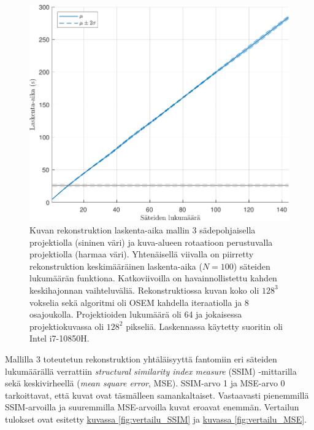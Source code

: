 \begin{figure}[H]
    \centering
    \captionsetup{width=.9\linewidth}
    \includegraphics[width=.9\linewidth]{kuvat/laskenta_aika.pdf}
    \caption{Kuvan rekonstruktion laskenta-aika mallin 3 sädepohjaisella projektiolla (sininen väri) ja kuva-alueen rotaatioon perustuvalla projektiolla (harmaa väri). Yhtenäisellä viivalla on piirretty rekonstruktion keskimääräinen laskenta-aika ($N=100$) säteiden lukumäärän funktiona. Katkoviivoilla on havainnollistettu kahden keskihajonnan vaihteluväliä. Rekonstruktiossa kuvan koko oli $128^3$ vokselia sekä algoritmi oli OSEM kahdella iteraatiolla ja 8 osajoukolla. Projektioiden lukumäärä oli 64 ja jokaisessa projektiokuvassa oli $128^2$ pikseliä. Laskennassa käytetty suoritin oli Intel i7-10850H.}
    \label{fig:laskenta_aika}
\end{figure}

Mallilla 3 toteutetun rekonstruktion yhtäläisyyttä fantomiin eri säteiden lukumäärällä verrattiin \textit{structural similarity index measure} (SSIM) -mittarilla sekä keskivirheellä (\textit{mean square error}, MSE). SSIM-arvo 1 ja MSE-arvo 0 tarkoittavat, että kuvat ovat täsmälleen samankaltaiset. Vastaavasti pienemmillä SSIM-arvoilla ja suuremmilla MSE-arvoilla kuvat eroavat enemmän. Vertailun tulokset ovat esitetty \hyperref[fig:vertailu_SSIM]{kuvassa \ref*{fig:vertailu_SSIM}} ja \hyperref[fig:vertailu_MSE]{kuvassa \ref*{fig:vertailu_MSE}}.

